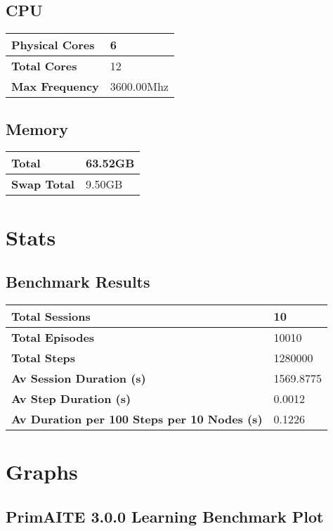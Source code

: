 \documentclass{article}%
\begin{document}
%
\subsection{CPU}%
\label{subsec:CPU}%
\begin{tabular}{|l|l|}%
\hline%
\textbf{Physical Cores}&6\\%
\hline%
\textbf{Total Cores}&12\\%
\hline%
\textbf{Max Frequency}&3600.00Mhz\\%
\hline%
\end{tabular}

%
\subsection{Memory}%
\label{subsec:Memory}%
\begin{tabular}{|l|l|}%
\hline%
\textbf{Total}&63.52GB\\%
\hline%
\textbf{Swap Total}&9.50GB\\%
\hline%
\end{tabular}

%
\section{Stats}%
\label{sec:Stats}%
\subsection{Benchmark Results}%
\label{subsec:BenchmarkResults}%
\begin{tabular}{|l|l|}%
\hline%
\textbf{Total Sessions}&10\\%
\hline%
\textbf{Total Episodes}&10010\\%
\hline%
\textbf{Total Steps}&1280000\\%
\hline%
\textbf{Av Session Duration (s)}&1569.8775\\%
\hline%
\textbf{Av Step Duration (s)}&0.0012\\%
\hline%
\textbf{Av Duration per 100 Steps per 10 Nodes (s)}&0.1226\\%
\hline%
\end{tabular}

%
\section{Graphs}%
\label{sec:Graphs}%
\subsection{PrimAITE 3.0.0 Learning Benchmark Plot}%
\label{subsec:PrimAITE3.0.0LearningBenchmarkPlot}%
\end{document}

